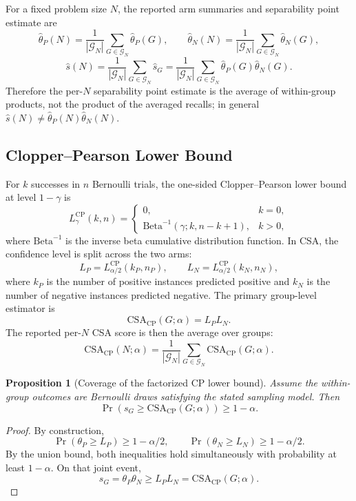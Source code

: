 \documentclass[10pt,conference]{IEEEtran}
\newtheorem{proposition}{Proposition}
\theoremstyle{remark}
\newcommand{\CSACP}{\mathrm{CSA}_{\mathrm{CP}}}
\begin{document}
For a fixed problem size $N$, the reported arm summaries and separability point estimate are
\[
\hat\theta_P(N)=\frac{1}{|\mathcal{G}_N|}\sum_{G\in\mathcal{G}_N}\hat\theta_P(G),\qquad
\hat\theta_N(N)=\frac{1}{|\mathcal{G}_N|}\sum_{G\in\mathcal{G}_N}\hat\theta_N(G),
\]
\[
\hat s(N)=\frac{1}{|\mathcal{G}_N|}\sum_{G\in\mathcal{G}_N}\hat s_G
=\frac{1}{|\mathcal{G}_N|}\sum_{G\in\mathcal{G}_N}\hat\theta_P(G)\hat\theta_N(G).
\]
Therefore the per-$N$ separability point estimate is the average of within-group products, not the product of the averaged recalls; in general $\hat s(N)\neq \hat\theta_P(N)\hat\theta_N(N)$.

\subsection{Clopper--Pearson Lower Bound}

For $k$ successes in $n$ Bernoulli trials, the one-sided Clopper--Pearson lower bound at level $1-\gamma$ is
\[
L^{\mathrm{CP}}_{\gamma}(k,n)=
\begin{cases}
0, & k=0,\\
\mathrm{Beta}^{-1}(\gamma;k,n-k+1), & k>0,
\end{cases}
\]
where $\mathrm{Beta}^{-1}$ is the inverse beta cumulative distribution function.  In CSA, the confidence level is split across the two arms:
\[
L_P=L^{\mathrm{CP}}_{\alpha/2}(k_P,n_P),
\qquad
L_N=L^{\mathrm{CP}}_{\alpha/2}(k_N,n_N),
\]
where $k_P$ is the number of positive instances predicted positive and $k_N$ is the number of negative instances predicted negative.  The primary group-level estimator is
\[
\CSACP(G;\alpha)=L_PL_N.
\]
The reported per-$N$ CSA score is then the average over groups:
\[
\CSACP(N;\alpha)=\frac{1}{|\mathcal{G}_N|}\sum_{G\in\mathcal{G}_N}\CSACP(G;\alpha).
\]

\begin{proposition}[Coverage of the factorized CP lower bound]
Assume the within-group outcomes are Bernoulli draws satisfying the stated sampling model.  Then
\[
\Pr\left(s_G\ge \CSACP(G;\alpha)\right)\ge 1-\alpha.
\]
\end{proposition}

\begin{proof}
By construction,
\[
\Pr(\theta_P\ge L_P)\ge 1-\alpha/2,\qquad
\Pr(\theta_N\ge L_N)\ge 1-\alpha/2.
\]
By the union bound, both inequalities hold simultaneously with probability at least $1-\alpha$.  On that joint event,
\[
s_G=\theta_P\theta_N\ge L_PL_N=\CSACP(G;\alpha).
\]
\end{proof}
\end{document}
